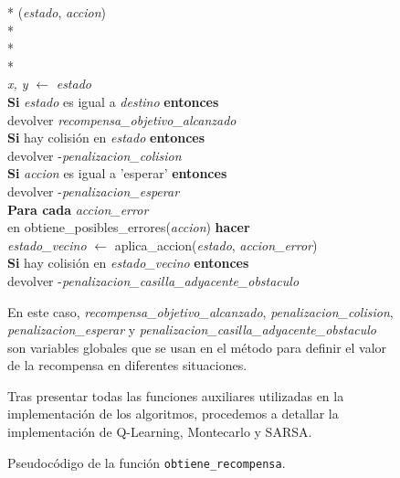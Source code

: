 \documentclass[conference,a4paper]{IEEEtran}
\begin{document}
\begin{figure}[h]
  \begin{pseudo}*
    (\textit{estado}, \textit{accion}) \\*
     \\*
     \\*
     \\
    \textit{x, y} $\leftarrow$ \textit{estado} \\
    \textbf{Si} \textit{estado} es igual a \textit{destino} \textbf{entonces} \\
    \> devolver \textit{recompensa\_objetivo\_alcanzado} \\
    \textbf{Si} hay colisión en \textit{estado} \textbf{entonces} \\
    \> devolver -\textit{penalizacion\_colision} \\
    \textbf{Si} \textit{accion} es igual a 'esperar' \textbf{entonces} \\
    \> devolver -\textit{penalizacion\_esperar} \\
    \textbf{Para cada} \textit{accion\_error} \\ en obtiene\_posibles\_errores(\textit{accion}) \textbf{hacer} \\
    \> \textit{estado\_vecino} $\leftarrow$ aplica\_accion(\textit{estado}, \textit{accion\_error}) \\
    \> \textbf{Si} hay colisión en \textit{estado\_vecino} \textbf{entonces} \\
    \> \> devolver -\textit{penalizacion\_casilla\_adyacente\_obstaculo} \\
  \end{pseudo}
  \caption{Pseudocódigo de la función \texttt{obtiene\_recompensa}.}
  \label{fig:obtiene_recompensa}
  \vspace{0.5cm} 
  En este caso, \textit{recompensa\_objetivo\_alcanzado}, \textit{penalizacion\_colision}, \textit{penalizacion\_esperar} y \textit{penalizacion\_casilla\_adyacente\_obstaculo}
son variables globales que se usan en el método para definir el valor de la recompensa en diferentes situaciones.\newline

Tras presentar todas las funciones auxiliares utilizadas en la implementación de los algoritmos, procedemos a detallar la implementación de Q-Learning, Montecarlo y SARSA.\newline 

\end{figure}
\end{document}

